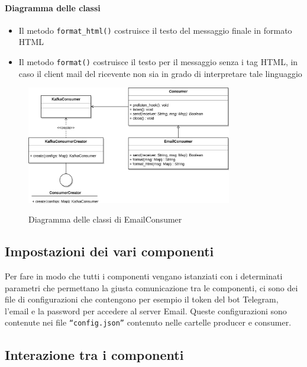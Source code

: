 \paragraph{Diagramma delle classi}

\begin{itemize}
    \item Il metodo \texttt{format\_html()} costruisce il testo del messaggio finale in formato HTML
    \item Il metodo \texttt{format()} costruisce il testo per il messaggio senza i tag HTML, in caso il client mail del ricevente non sia in grado
        di interpretare tale linguaggio
\end{itemize}

\begin{figure}[H]
    \centering
    \includegraphics[width=0.8\textwidth]{img/Consumers-EmailConsumer.png}\\
    \caption{Diagramma delle classi di EmailConsumer}
\end{figure}


\subsection{Impostazioni dei vari componenti}

Per fare in modo che tutti i componenti vengano istanziati con i determinati parametri che permettano la giusta comunicazione tra le componenti,
ci sono dei file di configurazioni che contengono per esempio il token del bot Telegram, l'email e la password per accedere al server Email. Queste configurazioni
sono contenute nei file \texttt{``config.json''} contenuto nelle cartelle producer e consumer.

\subsection{Interazione tra i componenti}

